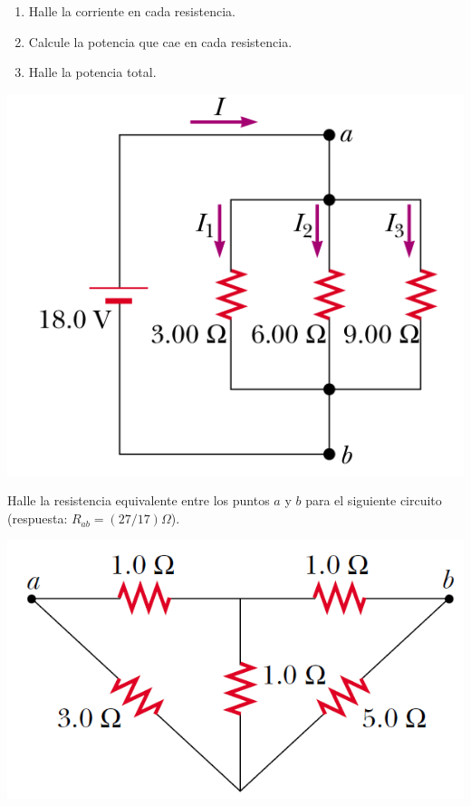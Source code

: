 \documentclass[12pt]{article}
\begin{document}
\begin{enumerate}
\begin{minipage}{11 cm}{
\begin{enumerate}
\item Halle la corriente en cada resistencia.
\item Calcule la potencia que cae en cada resistencia. 
\item Halle la potencia total.
\end{enumerate} 
}
\end{minipage}
\begin{minipage}{5 cm}{
\includegraphics[scale=0.3]{grafica-3resistencias}
}\end{minipage}

\begin{minipage}{11 cm}{
\item Halle la resistencia equivalente entre los puntos $a$ y $b$ para el siguiente circuito (respuesta: $R_{ab}=(27/17)\Omega$).}
\end{minipage}
\begin{minipage}{5 cm}{
\includegraphics[scale=0.3]{grafica7}
}\end{minipage}


\end{enumerate}
\end{document}
